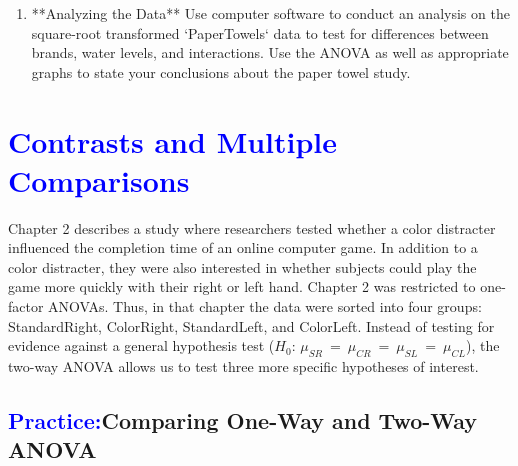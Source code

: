 \documentclass[
]{report}
\begin{document}
\begin{enumerate}
\begin{enumerate}
  \item Is there any extreme skewness or outliers that would cause us to question the normality assumption?
  \item Without doing any statistical calculations, do you expect to reject the three null hypotheses for the paper towel study? Justify your answer by visually comparing the variation (i.e., the spread) in the strength between groups to the variation within groups.
\end{enumerate}

\item **Analyzing the Data** Use computer software to conduct an analysis on the square-root transformed `PaperTowels` data to test for differences between brands, water levels, and interactions. Use the ANOVA as well as appropriate graphs to state your conclusions about the paper towel study.
\end{enumerate}

\hypertarget{section-46}{%
\section{\texorpdfstring{\textcolor{blue}{Contrasts and Multiple Comparisons}}{}}\label{section-46}}

Chapter 2 describes a study where researchers tested whether a color distracter influenced the completion time of an online computer game. In addition to a color distracter, they were also interested in whether subjects could play the game more quickly with their right or left hand. Chapter 2 was restricted to one-factor ANOVAs. Thus, in that chapter the data were sorted into four groups: StandardRight, ColorRight, StandardLeft, and ColorLeft. Instead of testing for evidence against a general hypothesis test (\(\scriptstyle H_0\): \(\scriptstyle \mu_{SR} \ =\  \mu_{CR} \ =\  \mu_{SL} \ =\  \mu_{CL}\)), the two-way ANOVA allows us to test three more specific hypotheses of interest.

\hypertarget{comparing-one-way-and-two-way-anova}{%
\subsection*{\texorpdfstring{\textcolor{blue}{Practice:}Comparing One-Way and Two-Way ANOVA}{Comparing One-Way and Two-Way ANOVA}}\label{comparing-one-way-and-two-way-anova}}
\end{document}
